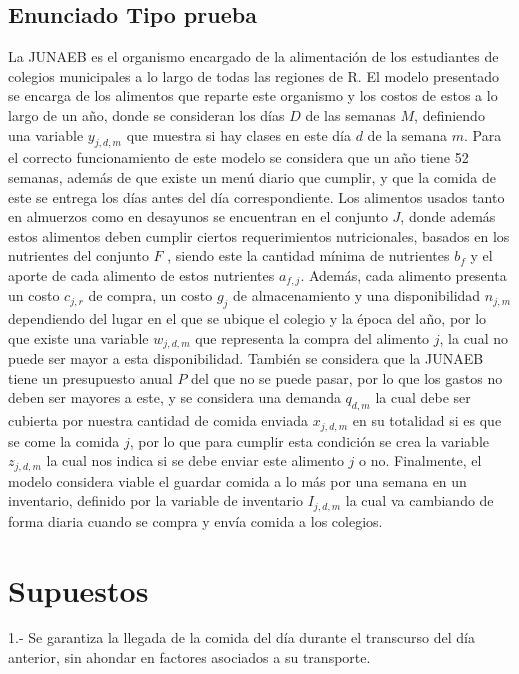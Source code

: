 \documentclass[letterpaper]{article}
\begin{document}
    \subsection{Enunciado Tipo prueba}
    La JUNAEB es el organismo encargado de la alimentación de los estudiantes de colegios municipales a lo largo de todas las regiones de R. El modelo presentado se encarga de los alimentos que reparte este organismo y los costos de estos a lo largo de un año, donde se consideran los días $D$ de las semanas $M$, definiendo una variable $y_{j,d,m}$ que muestra si hay clases en este día $d$ de la semana $m$. Para el correcto funcionamiento de este modelo se considera que un año tiene 52 semanas, además de que existe un menú diario que cumplir, y que la comida de este se entrega los días antes del día correspondiente. Los alimentos usados tanto en almuerzos como en desayunos se encuentran en el conjunto $J$, donde además estos alimentos deben cumplir ciertos requerimientos nutricionales, basados en los nutrientes del conjunto $F$ , siendo este la cantidad mínima de nutrientes $b_{f}$ y el aporte de cada alimento de estos nutrientes $a_{f,j}$. Además, cada alimento presenta un costo $c_{j,r}$ de compra, un costo $g_j$ de almacenamiento y una disponibilidad $n_{j,m}$ dependiendo del lugar en el que se ubique el colegio y la época del año, por lo que existe una variable $w_{j,d,m}$ que representa la compra del alimento $j$, la cual no puede ser mayor a esta disponibilidad. También se considera que la JUNAEB tiene un presupuesto anual $P$ del que no se puede pasar, por lo que los gastos no deben ser mayores a este, y se considera una demanda $q_{d,m}$ la cual debe ser cubierta por nuestra cantidad de comida enviada $x_{j,d,m}$ en su totalidad si es que se come la comida $j$, por lo que para cumplir esta condición se crea la variable $z_{j,d,m}$ la cual nos indica si se debe enviar este alimento $j$ o no. Finalmente, el modelo considera viable el guardar comida a lo más por una semana en un inventario, definido por la variable de inventario $I_{j,d,m}$ la cual va cambiando de forma diaria cuando se compra y envía comida a los colegios. 

\section{Supuestos}
\vspace{0.3cm}
1.- Se garantiza la llegada de la comida del día durante el transcurso del día anterior, sin ahondar en factores asociados a su transporte.
\end{document}
